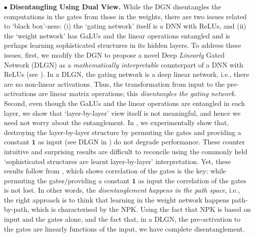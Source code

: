 $\bullet$ \textbf{Disentangling Using Dual View.} While the DGN disentangles the computations in the gates from those in the weights, there are two issues related to `black box'-ness: (i) the `gating network' itself is a DNN with ReLUs, and (ii) the `weight network' has GaLUs and the linear operations entangled and is perhaps learning sophisticated structures in its hidden layers. To address these issues, first, we modify the DGN  to propose a novel Deep \emph{Linearly} Gated Network (DLGN) as a \emph{mathematically interpretable} counterpart of a DNN with ReLUs (see ).  In a DLGN, the gating network is a deep linear network, i.e., there are no non-linear activations. Thus, the transformation from input to the pre-activations are linear matrix operations; this \emph{disentangles the gating network}. Second, even though the GaLUs and the linear operations are entangled in each layer, we show that `layer-by-layer' view itself is not meaningful, and hence we need not worry about the entanglement. In , we experimentally show that, destroying the layer-by-layer structure by permuting the gates and providing a constant $\mathbf{1}$ as input (see DLGN in ) do not  degrade performance. These counter intuitive and surprising results are difficult to reconcile using the commonly held `sophisticated structures are learnt layer-by-layer' interpretation.  Yet, these results follow from , which shows correlation of the gates is the key: while permuting the gates/providing a constant $\mathbf{1}$ as input the correlation of the gates is not lost. In other words, the \emph{disentanglement  happens in the path space}, i.e., the right approach is to think that learning in the weight network happens path-by-path, which is characterised by the NPK. Using the fact that NPK is based on input and the gates alone, and the fact that, in a DLGN, the pre-activation to the gates are linearly functions of the input, we have complete disentanglement.


